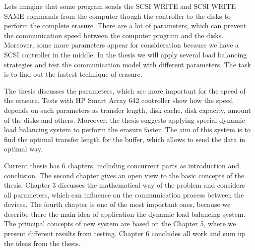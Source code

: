 Lets imagine that some program sends the SCSI WRITE and SCSI WRITE SAME commands from the computer though the controller to the disks to perform the complete erasure. There are a lot of parameters, which can prevent the communication speed between the computer program and the disks. Moreover, some more parameters appear for consideration because we have a SCSI controller in the middle. In the thesis we will apply several load balancing strategies and test the communication model with different parameters. The task is to find out the fastest technique of erasure.

The thesis discusses the parameters, which are more important for the speed of the erasure. Tests with HP Smart Array 642 controller show how the speed depends on such parameters as transfer length, disk cache, disk capacity, amount of the disks and others. Moreover, the thesis suggests applying special dynamic load balancing system to perform the erasure faster. The aim of this system is to find the optimal transfer length for the buffer, which allows to send the data in optimal way. 

Current thesis has 6 chapters, including concurrent parts as introduction and conclusion. The second chapter gives an open view to the basic concepts of the thesis. Chapter 3 discusses the mathematical way of the problem and considers all parameters, which can influence on the communication process between the devices. The fourth chapter is one of the most important ones, because we describe there the main idea of application the dynamic load balancing system. The principal concepts of new system are based on the Chapter 5, where we present different results from testing. Chapter 6 concludes all work and sum up the ideas from the thesis.

